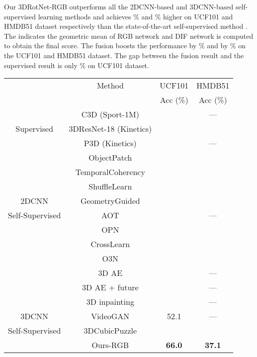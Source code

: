 \documentclass[10pt,twocolumn,letterpaper]{article}
\begin{document}
Our 3DRotNet-RGB outperforms all the 2DCNN-based and 3DCNN-based self-supervised learning methods and achieves \% and \% higher on UCF101 and HMDB51 dataset respectively than the state-of-the-art self-supervised method \cite{CubicPuzzles}. The  indicates the geometric mean of RGB network and DIF network is computed to obtain the final score. The fusion boosts the performance by \% and by \% on the UCF101 and HMDB51 dataset. The gap between the fusion result and the supervised result \cite{3DResNet} is only \% on UCF101 dataset. 

\begin{table}[t]
\small
\begin{center}
\begin{tabular}{c|c|c|c}
\hline
                &{Method}   &UCF101    &HMDB51\\
                &           &Acc (\%)  &Acc (\%)\\
\hline\hline
                            &C3D (Sport-1M)         &   &---\\
{\scriptsize Supervised}    &3DResNet-18 (Kinetics)    &   &\\
                            &P3D (Kinetics)         &   &---\\
\hline
                     &ObjectPatch  \cite{wang2015unsupervised} & &\\
                     &TemporalCoherency  \cite{mobahi2009deep} & &\\
                     &ShuffleLearn  \cite{shuffleandlearn}   & &\\
{\scriptsize 2DCNN}  &{GeometryGuided}  \cite{Gan_2018_CVPR}   & &\\
{\scriptsize Self-Supervised}    &{AOT} \cite{AOT}      &  &---\\
                    &{OPN} \cite{OPN}      &  &\\
                    &{CrossLearn} \cite{crossandlearn}      &  &\\
                    &{O3N} \cite{O3N}         &     &\\
\hline


&3D AE \cite{CubicPuzzles}  &  &---\\
&3D AE + future \cite{CubicPuzzles}  &  &---\\
&3D inpainting \cite{CubicPuzzles}  &  &---\\
{\scriptsize 3DCNN}  &VideoGAN \cite{videogan} &52.1 &---\\
{\scriptsize Self-Supervised}&3DCubicPuzzle \cite{CubicPuzzles}  &  &\\
            &Ours-RGB  &\textbf{66.0}   &\textbf{37.1}\\


\end{tabular}
\end{center}
\end{table}
\end{document}
